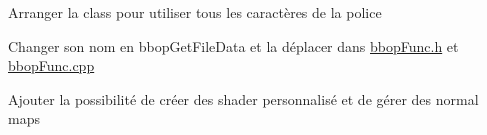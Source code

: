 
\begin{DoxyRefList}
\item[Member \mbox{\hyperlink{classFont_a41a7dca42ac0df85a27163dc9ace9de3}{Font\+::Font}} (int glyph\+Size, const char $\ast$ttf\+Path)]\label{todo__todo000002}%
%
Arranger la class pour utiliser tous les caractères de la police  
\item[Member \mbox{\hyperlink{bbopGlobal_8cpp_abad8b4d4b0f318cf85947bef83f84526}{get\+File\+Data}} (const char $\ast$filename)]\label{todo__todo000001}%
%
Changer son nom en bbop\+Get\+File\+Data et la déplacer dans \mbox{\hyperlink{bbopFunc_8h}{bbop\+Func.\+h}} et \mbox{\hyperlink{bbopFunc_8cpp}{bbop\+Func.\+cpp}}  
\item[Class \mbox{\hyperlink{classScene}{Scene}} ]\label{todo__todo000003}%
%
Ajouter la possibilité de créer des shader personnalisé et de gérer des normal maps 
\end{DoxyRefList}